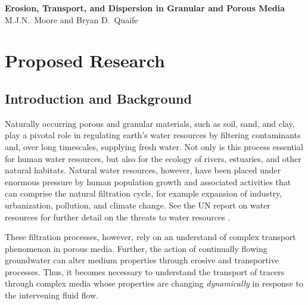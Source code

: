 \documentclass[11pt]{article}
\begin{document}
\begin{center}
{\large \bf Erosion, Transport, and Dispersion in Granular
and Porous Media} 
\\
M.J.N.~Moore and Bryan D.~Quaife
\end{center}


\section{Proposed Research} 

\subsection{Introduction and Background} 

	Naturally occurring porous and granular materials, such as soil, sand, and clay, play a pivotal role in regulating earth's water resources by filtering contaminants and, over long timescales, supplying fresh water. Not only is this process essential for human water resources, but also for the ecology of rivers, estuaries, and other natural habitats. Natural water resources, however, have been placed under enormous pressure by human population growth and associated activities that can comprise the natural filtration cycle, for example expansion of industry, urbanization, pollution, and climate change. See the UN report on water resources for further detail on the threats to water resources \cite{UNwater}.

	These filtration processes, however, rely on an understand of complex transport phenomenon in porous media. Further, the action of continually flowing groundwater can alter medium properties through erosive and transportive processes. Thus, it becomes necessary to understand the transport of tracers through complex media whose properties are changing {\em dynamically} in response to the intervening fluid flow.
	
\end{document}

